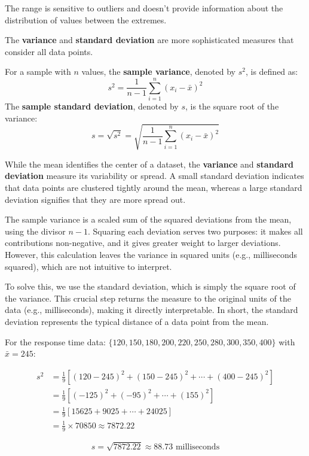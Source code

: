 \begin{remark}
The range is sensitive to outliers and doesn't provide information about the distribution of values between the extremes.
\end{remark}

The \textbf{variance} and \textbf{standard deviation} are more sophisticated measures that consider all data points.

\begin{definition}
For a sample with $n$ values, the \textbf{sample variance}, denoted by $s^2$, is defined as:
$$
s^2 = \frac{1}{n-1}\sum_{i=1}^{n}(x_i - \bar{x})^2
$$
The \textbf{sample standard deviation}, denoted by $s$, is the square root of the variance:
$$
s = \sqrt{s^2} = \sqrt{\frac{1}{n-1}\sum_{i=1}^{n}(x_i - \bar{x})^2}
$$
\end{definition}

While the mean identifies the center of a dataset, the \textbf{variance} and \textbf{standard deviation} measure its variability or spread. A small standard deviation indicates that data points are clustered tightly around the mean, whereas a large standard deviation signifies that they are more spread out.

The sample variance is a scaled sum of the squared deviations from the mean, using the divisor $n-1$. Squaring each deviation serves two purposes: it makes all contributions non-negative, and it gives greater weight to larger deviations. However, this calculation leaves the variance in squared units (e.g., milliseconds squared), which are not intuitive to interpret.

To solve this, we use the standard deviation, which is simply the square root of the variance. This crucial step returns the measure to the original units of the data (e.g., milliseconds), making it directly interpretable. In short, the standard deviation represents the typical distance of a data point from the mean.

\begin{example}\par

    For the response time data: $\{120, 150, 180, 200, 220, 250, 280, 300, 350, 400\}$ with $\bar{x} = 245$:

\begin{align*}
s^2 &= \frac{1}{9}[(120-245)^2 + (150-245)^2 + \cdots + (400-245)^2] \\
&= \frac{1}{9}[(-125)^2 + (-95)^2 + \cdots + (155)^2] \\
&= \frac{1}{9}[15625 + 9025 + \cdots + 24025] \\
    &= \frac{1}{9} \times 70850 \approx 7872.22
\end{align*}

\[
s = \sqrt{7872.22} \approx 88.73 \text{ milliseconds}
\]
\end{example}

